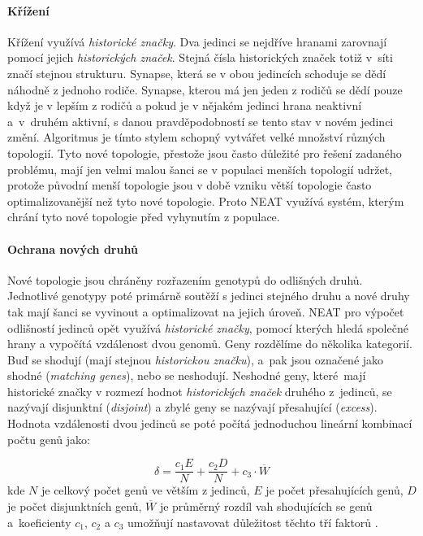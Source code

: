 \paragraph{Křížení}
Křížení využívá \emph{historické značky}. Dva jedinci se nejdříve hranami
zarovnají pomocí jejich \emph{historických značek}. Stejná čísla historických
značek totiž v~síti značí stejnou strukturu. Synapse, která se v obou jedincích
schoduje se dědí náhodně z jednoho rodiče. Synapse, kterou má jen jeden z
rodičů se dědí pouze když je v lepším z rodičů a pokud je v nějakém jedinci
hrana neaktivní a~v~druhém aktivní, s danou pravděpodobností se tento stav v
novém jedinci změní. Algoritmus je tímto stylem schopný vytvářet velké množství
různých topologií. Tyto nové topologie, přestože jsou často důležité pro řešení
zadaného problému, mají jen velmi malou šanci se v populaci menších topologií
udržet, protože původní menší topologie jsou v době vzniku větší topologie
často optimalizovanější než tyto nové topologie. Proto NEAT využívá systém, kterým
chrání tyto nové topologie před vyhynutím z populace.

\paragraph{Ochrana nových druhů}
Nové topologie jsou chráněny rozřazením genotypů do odlišných druhů. Jednotlivé
genotypy poté primárně soutěží s jedinci stejného druhu a nové druhy tak mají
šanci se vyvinout a optimalizovat na jejich úroveň. NEAT pro výpočet odlišností
jedinců opět využívá \emph{historické značky}, pomocí kterých hledá společné
hrany a vypočítá vzdálenost dvou genomů. Geny rozdělíme do několika kategorií.
Buď se shodují (mají stejnou \emph{historickou značku}), a~pak jsou označené
jako shodné (\emph{matching genes}), nebo se neshodují. Neshodné geny,
které~mají historické značky v rozmezí hodnot \emph{historických značek}
druhého z~jedinců, se nazývají disjunktní (\emph{disjoint}) a zbylé geny se
nazývají přesahující (\emph{excess}). Hodnota vzdálenosti dvou jedinců se poté
počítá jednoduchou lineární kombinací počtu genů jako:

\begin{equation}
    \delta = \frac{c_1E}{N} + \frac{c_2D}{N} + c_3\cdot\overline{W}
\end{equation}
kde $N$ je celkový počet genů ve větším z jedinců, $E$ je počet přesahujících
genů, $D$ je počet disjunktních genů, $\overline{W}$ je průměrný rozdíl vah
shodujících se genů a~koeficienty $c_1$, $c_2$ a $c_3$ umožňují nastavovat
důležitost těchto tří faktorů \citep{stanley2002evolving}.

